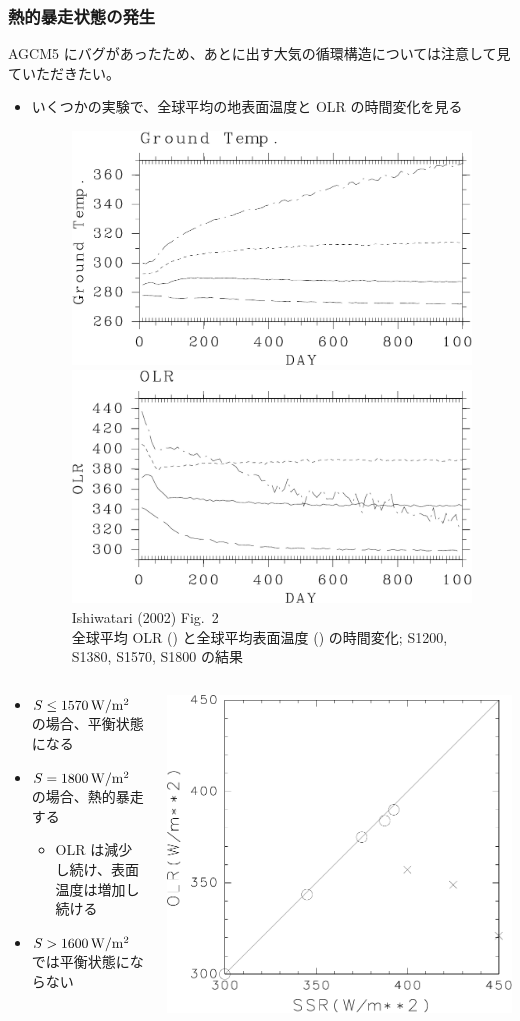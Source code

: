 \documentclass[aspectratio=149,9pt,fleqn]{beamer}
\begin{document}
\begin{frame}
	\frametitle{熱的暴走状態の発生}
	{\footnotesize
		AGCM5 にバグがあったため、あとに出す大気の循環構造については注意して見ていただきたい。
	}
	\begin{itemize}
		\item いくつかの実験で、全球平均の地表面温度と OLR の時間変化を見る
			\begin{figure}
				\scriptsize
				\includegraphics[width=.35\textwidth]{./fig/Tg-seqs.kps-crop.pdf}
				\includegraphics[width=.35\textwidth]{./fig/OLR-seqs.kps-crop.pdf}\\
				Ishiwatari \etal (2002) Fig.~2\\
				全球平均 OLR () と全球平均表面温度 () の時間変化;
				S1200, S1380, S1570, S1800 の結果
			\end{figure}
	\end{itemize}
	\begin{columns}[T,onlytextwidth]
		\begin{column}{.6\textwidth}
			\begin{itemize}
				\item \(S\leq1570\hmu{W/m^2}\) の場合、平衡状態になる
				\item \(S=1800\hmu{W/m^2}\) の場合、熱的暴走する
					\begin{itemize}
						\item OLR は減少し続け、表面温度は増加し続ける
					\end{itemize}
				\item \(S>1600\hmu{W/m^2}\) では平衡状態にならない
			\end{itemize}
		\end{column}
		\begin{column}{.4\textwidth}
			\centering\scriptsize
			\includegraphics[width=.6\textwidth]{./fig/ISR-OLR.kps-crop.pdf}\\

\end{column}
\end{columns}
\end{frame}
\end{document}

